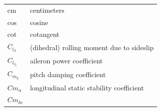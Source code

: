 \documentclass[
]{book}
\begin{document}
\begin{longtable}[]{@{}ll@{}}
\begin{minipage}[t]{0.47\columnwidth}\raggedright
cm\strut
\end{minipage} & \begin{minipage}[t]{0.47\columnwidth}\raggedright
centimeters\strut
\end{minipage}\tabularnewline
\begin{minipage}[t]{0.47\columnwidth}\raggedright
cos\strut
\end{minipage} & \begin{minipage}[t]{0.47\columnwidth}\raggedright
cosine\strut
\end{minipage}\tabularnewline
\begin{minipage}[t]{0.47\columnwidth}\raggedright
cot\strut
\end{minipage} & \begin{minipage}[t]{0.47\columnwidth}\raggedright
cotangent\strut
\end{minipage}\tabularnewline
\begin{minipage}[t]{0.47\columnwidth}\raggedright
\(C_{l_{\beta}}\)\strut
\end{minipage} & \begin{minipage}[t]{0.47\columnwidth}\raggedright
(dihedral) rolling moment due to sideslip\strut
\end{minipage}\tabularnewline
\begin{minipage}[t]{0.47\columnwidth}\raggedright
\(C_{l_{\delta_a}}\)\strut
\end{minipage} & \begin{minipage}[t]{0.47\columnwidth}\raggedright
aileron power coefficient\strut
\end{minipage}\tabularnewline
\begin{minipage}[t]{0.47\columnwidth}\raggedright
\(C_{m_q}\)\strut
\end{minipage} & \begin{minipage}[t]{0.47\columnwidth}\raggedright
pitch damping coefficient\strut
\end{minipage}\tabularnewline
\begin{minipage}[t]{0.47\columnwidth}\raggedright
\(C{m_{\alpha}}\)\strut
\end{minipage} & \begin{minipage}[t]{0.47\columnwidth}\raggedright
longitudinal static stability coefficient\strut
\end{minipage}\tabularnewline
\begin{minipage}[t]{0.47\columnwidth}\raggedright
\(C{m_{\delta e}}\)\strut
\end{minipage} & \begin{minipage}[t]{0.47\columnwidth}\raggedright

\end{minipage}
\end{longtable}
\end{document}
